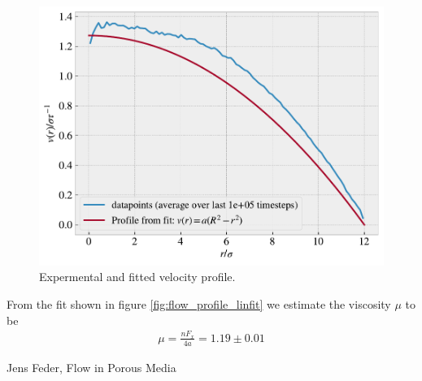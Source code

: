 \documentclass[reprint, amsmath, amssymb, aps]{revtex4-2}
\begin{document}
\begin{figure}[H]
  \includegraphics[width=\linewidth]{figures/flow_profile.pdf}
  \caption{Expermental and fitted velocity profile.}
  \label{fig:flow_profile}
\end{figure}

From the fit shown in figure \ref{fig:flow_profile_linfit} we estimate the viscosity $\mu$ to be
\begin{align*}
  \mu = \frac{n F_x}{4a} = 1.19 \pm 0.01
\end{align*}







\begin{thebibliography}{9}
Jens Feder, Flow in Porous Media
\end{thebibliography}
\end{document}
